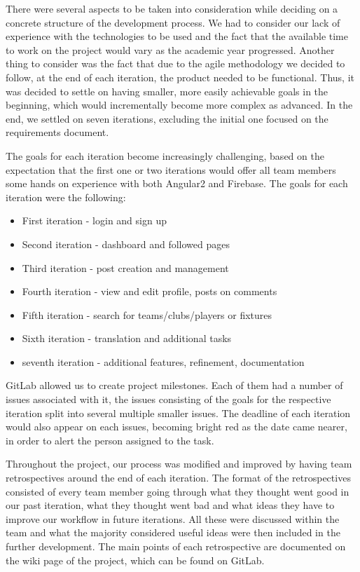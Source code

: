 \documentclass{l3proj}
\begin{document}
There were several aspects to be taken into consideration while deciding
 on a concrete structure of the development process. We had to consider
 our lack of experience with the technologies to be used and the fact
 that the available time to work on the project would vary as the academic
 year progressed. Another thing to consider was the fact that due to the
 agile methodology we decided to follow, at the end of each iteration, the
 product needed to be functional. Thus, it was decided to settle on having
 smaller, more easily achievable goals in the beginning, which would
 incrementally become more complex as advanced. In the end, we settled
 on seven iterations, excluding the initial one focused on the requirements
 document.

The goals for each iteration become increasingly challenging, based on the
 expectation that the first one or two iterations would offer all team
 members some hands on experience with both Angular2 and Firebase. The
 goals for each iteration were the following:
\begin{itemize}
\item First iteration - login and sign up
\item Second iteration - dashboard and followed pages
\item Third iteration - post creation and management
\item Fourth iteration - view and edit profile, posts on comments
\item Fifth iteration - search for teams/clubs/players or fixtures
\item Sixth iteration - translation and additional tasks
\item seventh iteration - additional features, refinement, documentation
\end{itemize}



GitLab allowed us to create project milestones. Each of them had a number
 of issues associated with it, the issues consisting of the goals for the
 respective iteration split into several multiple smaller issues. The deadline
 of each iteration would also appear on each issues, becoming bright red as the
 date came nearer, in order to alert the person assigned to the task.

Throughout the project, our process was modified and improved by having team
 retrospectives around the end of each iteration. The format of the retrospectives
 consisted of every team member going through what they thought went good in
 our past iteration, what they thought went bad and what ideas they have to
 improve our workflow in future iterations. All these were discussed within
 the team and what the majority considered useful ideas were then included
 in the further development. The main points of each retrospective are
 documented on the wiki page of the project, which can be found on GitLab.
\end{document}
